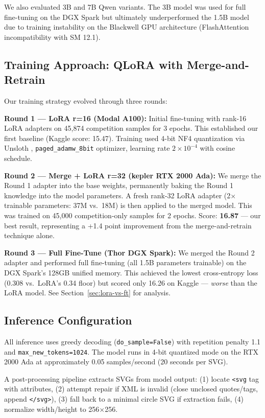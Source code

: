 \documentclass[11pt]{article}
\begin{document}
We also evaluated 3B and 7B Qwen variants. The 3B model was used for full fine-tuning on the DGX Spark but ultimately underperformed the 1.5B model due to training instability on the Blackwell GPU architecture (FlashAttention incompatibility with SM 12.1).

\subsection{Training Approach: QLoRA with Merge-and-Retrain}

Our training strategy evolved through three rounds:

\textbf{Round 1 --- LoRA r=16 (Modal A100):}
Initial fine-tuning with rank-16 LoRA adapters on 45,874 competition samples for 3 epochs. This established our first baseline (Kaggle score: 15.47). Training used 4-bit NF4 quantization via Unsloth \citep{unsloth2024}, \texttt{paged\_adamw\_8bit} optimizer, learning rate $2 \times 10^{-4}$ with cosine schedule.

\textbf{Round 2 --- Merge + LoRA r=32 (kepler RTX 2000 Ada):}
We merge the Round 1 adapter into the base weights, permanently baking the Round 1 knowledge into the model parameters. A fresh rank-32 LoRA adapter (2$\times$ trainable parameters: 37M vs.\ 18M) is then applied to the merged model. This was trained on 45,000 competition-only samples for 2 epochs. Score: \textbf{16.87} --- our best result, representing a +1.4 point improvement from the merge-and-retrain technique alone.

\textbf{Round 3 --- Full Fine-Tune (Thor DGX Spark):}
We merged the Round 2 adapter and performed full fine-tuning (all 1.5B parameters trainable) on the DGX Spark's 128GB unified memory. This achieved the lowest cross-entropy loss (0.308 vs.\ LoRA's 0.34 floor) but scored only 16.26 on Kaggle --- \textit{worse} than the LoRA model. See Section~\ref{sec:lora-vs-ft} for analysis.

\subsection{Inference Configuration}

All inference uses greedy decoding (\texttt{do\_sample=False}) with repetition penalty 1.1 and \texttt{max\_new\_tokens=1024}. The model runs in 4-bit quantized mode on the RTX 2000 Ada at approximately 0.05 samples/second (20 seconds per SVG).

A post-processing pipeline extracts SVGs from model output: (1) locate \texttt{<svg} tag with attributes, (2) attempt repair if XML is invalid (close unclosed quotes/tags, append \texttt{</svg>}), (3) fall back to a minimal circle SVG if extraction fails, (4) normalize width/height to 256$\times$256.
\end{document}
